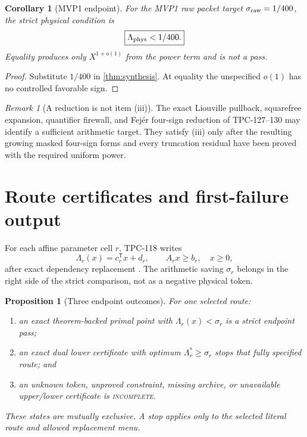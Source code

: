\documentclass[11pt]{article}
\newtheorem{proposition}[theorem]{Proposition}
\newtheorem{corollary}[theorem]{Corollary}
\theoremstyle{definition}
\theoremstyle{remark}
\newtheorem{remark}[theorem]{Remark}
\begin{document}
\begin{corollary}[MVP1 endpoint]
\label{cor:mvp1}
For the MVP1 raw packet target
\(\sigma_{\rm raw}=1/400\), the strict physical condition is
\[
 \boxed{\Lambda_{\rm phys}<1/400.}
\]
Equality produces only \(X^{1+o(1)}\) from the power term and is not a
pass.
\end{corollary}

\begin{proof}
Substitute \(1/400\) in \cref{thm:synthesis}.  At equality the
unspecified \(o(1)\) has no controlled favorable sign.
\end{proof}

\begin{remark}[A reduction is not item (iii)]
The exact Liouville pullback, squarefree expansion, quantifier
firewall, and Fej\'er four-sign reduction of TPC-127--130 may
identify a sufficient arithmetic target.  They satisfy (iii) only
after the resulting growing masked four-sign forms and every
truncation residual have been proved with the required uniform
power.
\end{remark}

\section{Route certificates and first-failure output}

For each affine parameter cell \(r\), TPC-118 writes
\[
 \Lambda_r(x)=c_r^{\mathsf T}x+d_r,\qquad
 A_rx\ge b_r,\quad x\ge0,
\]
after exact dependency replacement \citep{WangTPC118}.  The
arithmetic saving \(\sigma_r\) belongs in the right side of the strict
comparison, not as a negative physical token.

\begin{proposition}[Three endpoint outcomes]
\label{prop:outcomes}
For one selected route:
\begin{enumerate}[label=(\roman*),leftmargin=2em]
\item an exact theorem-backed primal point with
  \(\Lambda_r(x)<\sigma_r\) is a strict endpoint pass;
\item an exact dual lower certificate with optimum
  \(\Lambda_r^*\ge\sigma_r\) stops that fully specified route; and
\item an unknown token, unproved constraint, missing archive, or
  unavailable upper/lower certificate is
  \textnormal{\textsc{incomplete}}.
\end{enumerate}
These states are mutually exclusive.  A stop applies only to the
selected literal route and allowed replacement menu.
\end{proposition}
\end{document}
